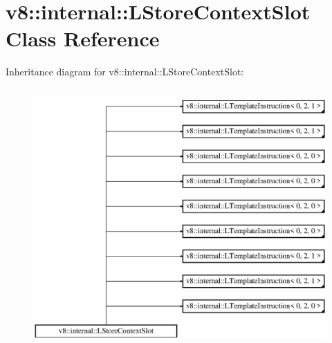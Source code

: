 \hypertarget{classv8_1_1internal_1_1_l_store_context_slot}{}\section{v8\+:\+:internal\+:\+:L\+Store\+Context\+Slot Class Reference}
\label{classv8_1_1internal_1_1_l_store_context_slot}
Inheritance diagram for v8\+:\+:internal\+:\+:L\+Store\+Context\+Slot\+:\begin{figure}[H]
\begin{center}
\leavevmode
\includegraphics[height=10.000000cm]{classv8_1_1internal_1_1_l_store_context_slot}
\end{center}
\end{figure}
